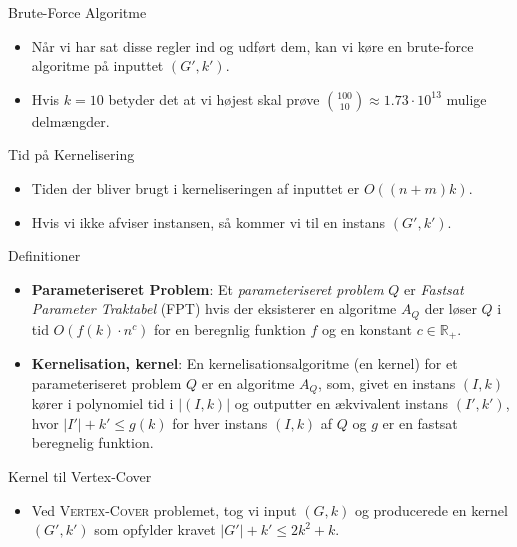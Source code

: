 \begin{frame}{Brute-Force Algoritme}
    \begin{itemize}
        \item Når vi har sat disse regler ind og udført dem, kan vi køre en brute-force algoritme på inputtet $(G', k')$.
        \item Hvis $k = 10$ betyder det at vi højest skal prøve $\binom{100}{10} \approx 1.73 \cdot 10^{13}$ mulige delmængder.
    \end{itemize}
\end{frame}

\begin{frame}{Tid på Kernelisering}
    \begin{itemize}
        \item Tiden der bliver brugt i kerneliseringen af inputtet er $O((n+m)k)$.
        \item Hvis vi ikke afviser instansen, så kommer vi til en instans $(G', k')$.
    \end{itemize}
\end{frame}

\begin{frame}{Definitioner}
    \begin{itemize}
        \item \textbf{Parameteriseret Problem}: Et \textit{parameteriseret problem} $Q$ er \textit{Fastsat Parameter Traktabel} (FPT) hvis der eksisterer en algoritme $A_{Q}$ der løser $Q$ i tid $O(f(k) \cdot n^{c})$ for en beregnlig funktion $f$ og en konstant $c \in \mathbb{R}_{+}$.
        \item \textbf{Kernelisation, kernel}: En kernelisationsalgoritme (en kernel) for et parameteriseret problem $Q$ er en algoritme $A_{Q}$, som, givet en instans $(I,k)$ kører i polynomiel tid i $|(I,k)|$ og outputter en ækvivalent instans $(I', k')$, hvor $|I'| + k' \le g(k)$ for hver instans $(I, k)$ af $Q$ og $g$ er en fastsat beregnelig funktion.
    \end{itemize}
\end{frame}

\begin{frame}{Kernel til Vertex-Cover}
    \begin{itemize}
        \item Ved \textsc{Vertex-Cover} problemet, tog vi input $(G, k)$ og producerede en kernel $(G', k')$ som opfylder kravet $|G'| + k' \le 2k^{2} + k$.
    \end{itemize}
\end{frame}


